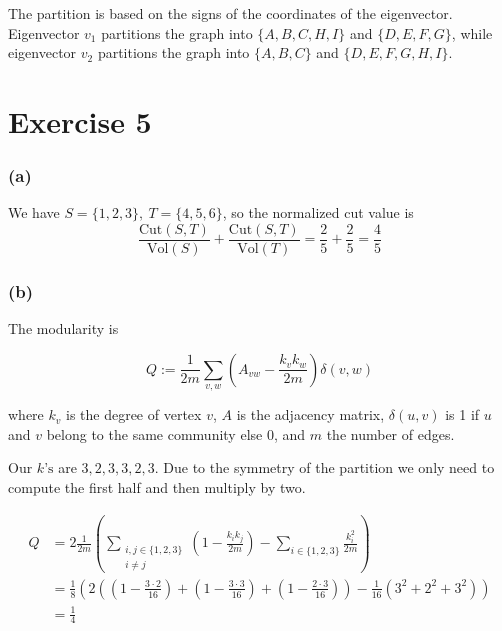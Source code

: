 \documentclass{article}
\begin{document}
The partition is based on the signs of the coordinates of the eigenvector.
Eigenvector \(v_1\) partitions the graph into
\(\{A, B, C, H, I\}\) and \(\{D, E, F, G\}\),
while eigenvector \(v_2\) partitions the graph into
\(\{A, B, C\}\) and \(\{D, E, F, G, H, I\}\).


\section*{Exercise 5}

\subsubsection*{(a)}

We have \(S = \{1,2,3\},\ T = \{4,5,6\}\), so the normalized cut value is
\begin{equation*}
    \frac{\textrm{Cut}(S, T)}{\textrm{Vol}(S)}
        +\frac{\textrm{Cut}(S, T)}{\textrm{Vol}(T)}
    = \frac{2}{5} + \frac{2}{5}
    = \frac{4}{5}
\end{equation*}

\subsubsection*{(b)}

The modularity is

\begin{equation*}
    Q := \frac{1}{2m} 
        \sum_{v, w} \left( A_{vw} - \frac{k_v k_w}{2m} \right)
        \delta(v, w)
\end{equation*}

where \(k_v\) is the degree of vertex \(v\),
\(A\) is the adjacency matrix,
\(\delta(u, v)\) is 1 if \(u\) and \(v\) belong to the same community else 0,
and \(m\) the number of edges.

Our \(k\textrm{'s}\) are \(3, 2, 3, 3, 2, 3\).
Due to the symmetry of the partition we only need to compute the first half
and then multiply by two.

\begin{align*}
    Q &= 2 \frac{1}{2m}
        \left(
            \sum_{\substack{i,j \in \{1,2,3\} \\ i\neq j}}
                \left( 1 - \frac{k_i k_j}{2m} \right)
            -\sum_{i \in \{1,2,3\}}\frac{k_i^2}{2m}
        \right)\\
      &= \frac{1}{8}
        \left(
            2 \left(
                (1 - \frac{3 \cdot 2}{16})
                + (1 - \frac{3 \cdot 3}{16})
                + (1 - \frac{2 \cdot 3}{16})
            \right)
            - \frac{1}{16}\left(
                3^2 + 2^2 + 3^2
            \right)
        \right)\\
      &= \frac{1}{4}
\end{align*}
\end{document}
